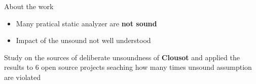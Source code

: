 \begin{frame}{About the work}

  \begin{itemize}
    \item Many pratical static analyzer are \textbf{not sound}

    \vspace*{0.5cm}

    \item Impact of the unsound not well understood
  \end{itemize}

  \vfill

  Study on the sources of deliberate unsoundness of \textbf{Clousot} and
  applied the results to 6 open source projects seaching how many times unsound assumption are violated

\end{frame}